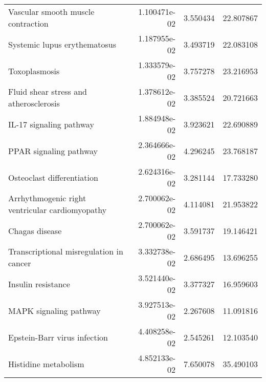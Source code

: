 \begin{tabular}{lrrr}
                Vascular smooth muscle contraction &      1.100471e-02 &  3.550434 &       22.807867 \\
                      Systemic lupus erythematosus &      1.187955e-02 &  3.493719 &       22.083108 \\
                                     Toxoplasmosis &      1.333579e-02 &  3.757278 &       23.216953 \\
            Fluid shear stress and atherosclerosis &      1.378612e-02 &  3.385524 &       20.721663 \\
                           IL-17 signaling pathway &      1.884948e-02 &  3.923621 &       22.690889 \\
                            PPAR signaling pathway &      2.364666e-02 &  4.296245 &       23.768187 \\
                        Osteoclast differentiation &      2.624316e-02 &  3.281144 &       17.733280 \\
   Arrhythmogenic right ventricular cardiomyopathy &      2.700062e-02 &  4.114081 &       21.953822 \\
                                    Chagas disease &      2.700062e-02 &  3.591737 &       19.146421 \\
           Transcriptional misregulation in cancer &      3.332738e-02 &  2.686495 &       13.696255 \\
                                Insulin resistance &      3.521440e-02 &  3.377327 &       16.959603 \\
                            MAPK signaling pathway &      3.927513e-02 &  2.267608 &       11.091816 \\
                      Epstein-Barr virus infection &      4.408258e-02 &  2.545261 &       12.103540 \\
                              Histidine metabolism &      4.852133e-02 &  7.650078 &       35.490103 \\
\bottomrule
\end{tabular}
